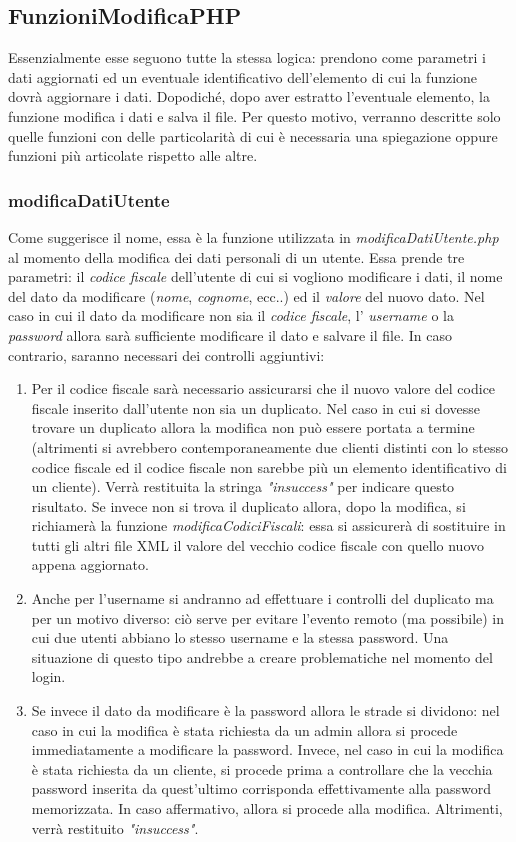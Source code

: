 \documentclass [a4paper, 12pt]{book}
\begin{document}
\subsection{FunzioniModificaPHP}
Essenzialmente esse seguono tutte la stessa logica: prendono come parametri i dati aggiornati ed un eventuale identificativo dell'elemento di cui la funzione dovrà aggiornare i dati. Dopodiché, dopo aver estratto l'eventuale elemento, la funzione modifica i dati e salva il file. Per questo motivo, verranno descritte solo quelle funzioni con delle particolarità di cui è necessaria una spiegazione oppure funzioni più articolate rispetto alle altre.

\subsubsection{modificaDatiUtente}
Come suggerisce il nome, essa è la funzione utilizzata in \textit{modificaDatiUtente.php} al momento della modifica dei dati personali di un utente. Essa prende tre parametri: il \textit{codice fiscale} dell'utente di cui si vogliono modificare i dati, il nome del dato da modificare (\textit{nome}, \textit{cognome}, ecc..) ed il \textit{valore} del nuovo dato. Nel caso in cui il dato da modificare non sia il \textit{codice fiscale}, l' \textit{username} o la \textit{password} allora sarà sufficiente modificare il dato e salvare il file. In caso contrario, saranno necessari dei controlli aggiuntivi:
\begin{enumerate}
\item Per il codice fiscale sarà necessario assicurarsi che il nuovo valore del codice fiscale inserito dall'utente non sia un duplicato. Nel caso in cui si dovesse trovare un duplicato allora la modifica non può essere portata a termine (altrimenti si avrebbero contemporaneamente due clienti distinti con lo stesso codice fiscale ed il codice fiscale non sarebbe più un elemento identificativo di un cliente). Verrà restituita la stringa \textit{"insuccess"} per indicare questo risultato. Se invece non si trova il duplicato allora, dopo la modifica, si richiamerà la funzione \textit{modificaCodiciFiscali}: essa si assicurerà di sostituire in tutti gli altri file XML il valore del vecchio codice fiscale con quello nuovo appena aggiornato.
\item Anche per l'username si andranno ad effettuare i controlli del duplicato ma per un motivo diverso: ciò serve per evitare l'evento remoto (ma possibile) in cui due utenti abbiano lo stesso username e la stessa password. Una situazione di questo tipo andrebbe a creare problematiche nel momento del login.
\item Se invece il dato da modificare è la password allora le strade si dividono: nel caso in cui la modifica è stata richiesta da un admin allora si procede immediatamente a modificare la password. Invece, nel caso in cui la modifica è stata richiesta da un cliente, si procede prima a controllare che la vecchia password inserita da quest'ultimo corrisponda effettivamente alla password memorizzata. In caso affermativo, allora si procede alla modifica. Altrimenti, verrà restituito \textit{"insuccess"}.
\end{enumerate}
\end{document}
